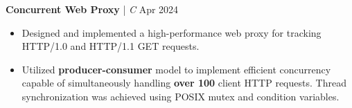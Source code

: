 \textbf{Concurrent Web Proxy} | \textit{C} \hfill Apr 2024 \par
\begin{itemize}
	\item Designed and implemented a high-performance web proxy for tracking HTTP/1.0 and HTTP/1.1 GET requests.
	\item Utilized \textbf{producer-consumer} model to implement efficient concurrency capable of simultaneously handling \textbf{over 100} client HTTP requests. Thread synchronization was achieved using POSIX mutex and condition variables.
\end{itemize} \par